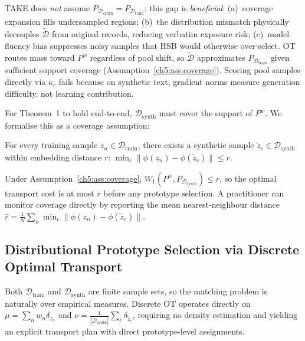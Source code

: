 \begin{foldable} %
	TAKE does \emph{not} assume $P_{\mathcal{D}_\text{synth}} = P_{\mathcal{D}_\text{train}}$; this gap is \emph{beneficial}:
	(a)~coverage expansion fills undersampled regions;
	(b)~the distribution mismatch physically decouples $\tilde{\mathcal{D}}$ from original records, reducing verbatim exposure risk;
	(c)~model fluency bias suppresses noisy samples that HSB would otherwise over-select.
	OT routes mass toward $P^w$ regardless of pool shift, so $\tilde{\mathcal{D}}$ approximates $P_{\mathcal{D}_\text{train}}$ given sufficient support coverage (Assumption~\ref{ch5:ass:coverage}).
	Scoring pool samples directly via $\kappa_c$ fails because on synthetic text, gradient norms measure generation difficulty, not learning contribution.

	For Theorem~1 to hold end-to-end, $\mathcal{D}_\text{synth}$ must cover the support of $P^w$.
	We formalise this as a coverage assumption:
	\begin{assumption}
		\label{ch5:ass:coverage}
		For every training sample $z_n \in \mathcal{D}_\text{train}$, there exists a synthetic sample $\tilde{z}_c \in \mathcal{D}_\text{synth}$ within embedding distance $r$:
		$\min_c \|\phi(z_n) - \phi(\tilde{z}_c)\| \leq r$.
	\end{assumption}
	Under Assumption~\ref{ch5:ass:coverage}, $W_1(P^w, P_{\mathcal{D}_\text{synth}}) \leq r$, so the optimal transport cost is at most $r$ before any prototype selection.
	A practitioner can monitor coverage directly by reporting the mean nearest-neighbour distance $\bar{r} = \frac{1}{N}\sum_n \min_c \|\phi(z_n) - \phi(\tilde{z}_c)\|$.
\end{foldable}

\subsection{Distributional Prototype Selection via Discrete Optimal Transport} \label{ch5:sec:04-method-ot}

\begin{foldable} %
	Both $\mathcal{D}_\text{train}$ and $\mathcal{D}_\text{synth}$ are finite sample sets, so the matching problem is naturally over empirical measures.
	Discrete OT operates directly on $\mu = \sum_n w_n \delta_{z_n}$ and $\nu = \frac{1}{|\mathcal{D}_\text{synth}|}\sum_c \delta_{\tilde{z}_c}$, requiring no density estimation and yielding an explicit transport plan with direct prototype-level assignments.
\end{foldable}

